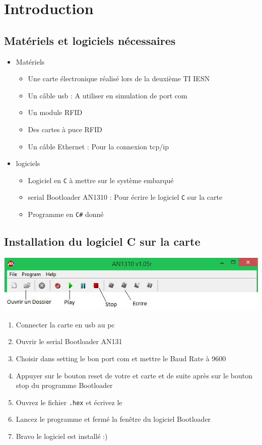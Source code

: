 \documentclass[12pt,a4paper]{report}
\begin{document}
\chapter{Introduction}
	\section{Matériels et logiciels nécessaires}
	\renewcommand {\labelitemii }{$\diamond $}	
		\begin{itemize}
			\item Matériels			
			\begin{itemize}
				\item Une carte électronique réalisé lors de la deuxième TI IESN		
				\item Un câble usb : A utiliser en simulation de port com		
				\item Un module RFID
				\item Des cartes à puce RFID
				\item Un câble Ethernet : Pour la connexion tcp/ip
			\end{itemize}
			\item logiciels
			\begin{itemize}
				\item Logiciel en \verb+C+ à mettre sur le système embarqué
				\item serial Bootloader AN1310 : Pour écrire le logiciel \verb+C+ sur la carte
				\item Programme en \verb+C#+ donné
			\end{itemize}
		\end{itemize}
	\section{Installation du logiciel C sur la carte}
	\includegraphics[scale=0.6]{BootloaderBouton.jpg}
		\begin{enumerate}
			\item Connecter la carte en usb au pc
			\item Ouvrir le serial Bootloader AN131
			\item Choisir dans setting le bon port com et mettre le Baud Rate à 9600
			\item Appuyer sur le bouton reset de votre et carte et de suite après sur le bouton stop 
			du programme Bootloader
			\item Ouvrez le fichier \verb+.hex+ et écrivez le
			\item Lancez le programme et fermé la fenêtre du logiciel Bootloader
			\item Bravo le logiciel est installé :)
		\end{enumerate}
\end{document}
